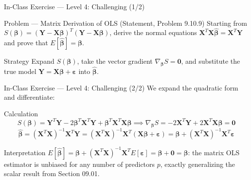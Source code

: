 \documentclass[10pt, aspectratio=169]{beamer}
\begin{document}
\begin{frame}{In-Class Exercise --- Level 4: Challenging (1/2)}
  \footnotesize
  \begin{block}{Problem --- Matrix Derivation of OLS (Statement, Problem 9.10.9)}
    Starting from $S(\boldsymbol\beta)=(\mathbf{Y}-\mathbf{X}\boldsymbol\beta)^T(\mathbf{Y}-\mathbf{X}\boldsymbol\beta)$, derive the normal equations $\mathbf{X}^T\mathbf{X}\hat{\boldsymbol\beta}=\mathbf{X}^T\mathbf{Y}$ and prove that $E[\hat{\boldsymbol\beta}]=\boldsymbol\beta$.
  \end{block}

  \vspace{0.1cm}
  \pause
  \begin{alertblock}{Strategy}
    \scriptsize
    Expand $S(\boldsymbol\beta)$, take the vector gradient $\nabla_{\boldsymbol\beta}S=\mathbf{0}$, and substitute the true model $\mathbf{Y}=\mathbf{X}\boldsymbol\beta+\boldsymbol\varepsilon$ into $\hat{\boldsymbol\beta}$.
  \end{alertblock}
\end{frame}

\begin{frame}{In-Class Exercise --- Level 4: Challenging (2/2)}
  \scriptsize
  We expand the quadratic form and differentiate: \pause

  \vspace{0.05cm}
  \begin{block}{Calculation}
    \scriptsize
    $$S(\boldsymbol\beta)=\mathbf{Y}^T\mathbf{Y}-2\boldsymbol\beta^T\mathbf{X}^T\mathbf{Y}+\boldsymbol\beta^T\mathbf{X}^T\mathbf{X}\boldsymbol\beta \implies \nabla_{\boldsymbol\beta}S=-2\mathbf{X}^T\mathbf{Y}+2\mathbf{X}^T\mathbf{X}\boldsymbol\beta=\mathbf{0}$$
    $$\hat{\boldsymbol\beta}=(\mathbf{X}^T\mathbf{X})^{-1}\mathbf{X}^T\mathbf{Y}=(\mathbf{X}^T\mathbf{X})^{-1}\mathbf{X}^T(\mathbf{X}\boldsymbol\beta+\boldsymbol\varepsilon)=\boldsymbol\beta+(\mathbf{X}^T\mathbf{X})^{-1}\mathbf{X}^T\boldsymbol\varepsilon$$
  \end{block}

  \vspace{0.05cm}
  \pause
  \begin{alertblock}{Interpretation}
    $E[\hat{\boldsymbol\beta}]=\boldsymbol\beta+(\mathbf{X}^T\mathbf{X})^{-1}\mathbf{X}^T E[\boldsymbol\varepsilon]=\boldsymbol\beta+\mathbf{0}=\boldsymbol\beta$: the matrix OLS estimator is unbiased for any number of predictors $p$, exactly generalizing the scalar result from Section 09.01.
  \end{alertblock}
\end{frame}
\end{document}

